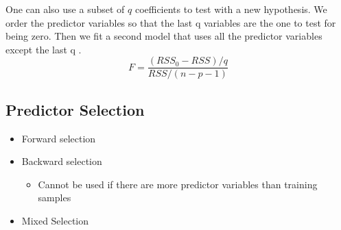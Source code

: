 \documentclass[../Main.tex]{subfiles}
\begin{document}
One can also use a subset of \(q\) coefficients to test with a new hypothesis. We order the predictor variables so that the last q variables are the one to test for being zero. Then we fit a second model that uses all the predictor variables except the last q .
\begin{equation}
    F = \frac{(RSS_0-RSS)/q}{RSS/(n-p-1)}
\end{equation}

\subsection{Predictor Selection}
\begin{itemize}
    \item Forward selection
    \item Backward selection
    \begin{itemize}
        \item Cannot be used if there are more predictor variables than training samples
    \end{itemize}
    \item Mixed Selection
\end{itemize}
\end{document}
